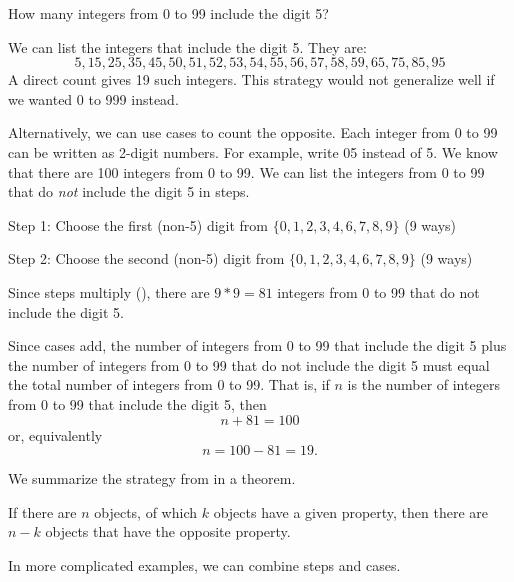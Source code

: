 \begin{exam}[Counting 0-99]
\label{exam_count100}
    How many integers from 0 to 99 include the digit 5?
        \begin{soln}
            We can list the integers that include the digit 5. They are:
                $$5, 15, 25, 35, 45, 50, 51, 52, 53, 54, 55, 56, 57, 58, 59, 65, 75, 85, 95$$
            A direct count gives 19 such integers.  This strategy would not generalize well if we wanted 0 to 999 instead.

            Alternatively, we can use cases to count the opposite.   Each integer from 0 to 99 can be written as 2-digit numbers.  For example, write 05 instead of 5.  We know that there are 100 integers from 0 to 99. We can list the integers from 0 to 99 that do \emph{not} include the digit 5 in steps.

            Step 1: Choose the first (non-5) digit from $\{0,1,2,3,4,6,7,8,9\}$ (9 ways)

            Step 2: Choose the second (non-5) digit from $\{0,1,2,3,4,6,7,8,9\}$ (9 ways)

            Since steps multiply (), there are $9*9=81$ integers from 0 to 99 that do not include the digit 5.

            Since cases add, the number of integers from 0 to 99 that include the digit 5 plus the number of integers from 0 to 99 that do not include the digit 5 must equal the total number of integers from 0 to 99.  That is, if $n$ is the number of integers from 0 to 99 that include the digit 5, then $$n + 81 = 100$$
            or, equivalently $$n = 100-81=19.$$
        \end{soln}
\end{exam}

We summarize the strategy from  in a theorem. 

\begin{thm}
\label{thm_count_complement}  
    If there are $n$ objects, of which $k$ objects have a given property, then there are $n-k$ objects that have the opposite property.
\end{thm}

In more complicated examples, we can combine steps and cases.

